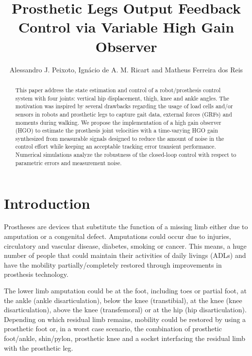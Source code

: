 \documentclass[letterpaper, 10 pt, conference]{ieeeconf}  %
\title{\LARGE \bf
Prosthetic Legs Output Feedback Control via Variable High Gain Observer}
\author{Alessandro J. Peixoto, %
        Ign\'{a}cio de A. M. Ricart and
        Matheus Ferreira dos Reis %
}
\theoremstyle{plain}
\theoremstyle{definition}
\theoremstyle{remark}
\begin{document}

\maketitle
\thispagestyle{empty}
\pagestyle{empty}
\begin{abstract}%
This paper address the state estimation and control of a robot/prosthesis control system with four joints: vertical hip displacement, thigh, knee and ankle angles. The motivation was inspired by several drawbacks regarding the usage of load cells and/or sensors in robots and prosthetic legs to capture gait data, external forces (GRFs) and moments during walking. We propose the implementation of a high gain observer (HGO)  to estimate the  prosthesis joint velocities with a time-varying HGO gain synthesized from measurable signals designed to reduce the amount of noise in the control effort while keeping an acceptable tracking error transient performance. Numerical simulations analyze the robustness of the closed-loop control with respect
to parametric errors and measurement noise.
\end{abstract}
\section{Introduction}

Prostheses are devices that substitute the function of a missing limb either due to amputation or a congenital defect. Amputations could occur due to injuries, circulatory and vascular disease, diabetes, smoking or cancer. This means, a huge number of people that could maintain their activities of daily livings (ADLs) and have the mobility partially/completely restored through improvements in prosthesis technology.

The lower limb amputation could be at the foot, including toes or partial foot, at the ankle (ankle disarticulation), below the knee (transtibial), at the knee (knee disarticulation), above the knee (transfemoral) or at the hip (hip disarticulation). Depending on which residual limb remains, mobility could be restored by using a prosthetic foot or, in a worst case scenario, the combination of prosthetic foot/ankle, shin/pylon, prosthetic knee and a socket interfacing the residual limb with the prosthetic leg. 
\end{document}
